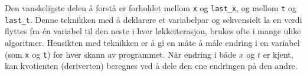 





Den vanskeligste delen å forstå er forholdet mellom {\tt x} og {\tt last\_x}, og mellom {\tt t} og {\tt last\_t}. Denne teknikken med å deklarere et variabelpar og sekvensielt la en verdi flyttes fra én variabel til den neste i hver løkkeiterasjon, brukes ofte i mange ulike algoritmer. Hensikten med teknikken er å gi en måte å måle endring i en variabel (som {\tt x} og {\tt t}) for hver skann av programmet. Når endring i både $x$ og $t$ er kjent, kan kvotienten (deriverten) beregnes ved å dele den ene endringen på den andre.









